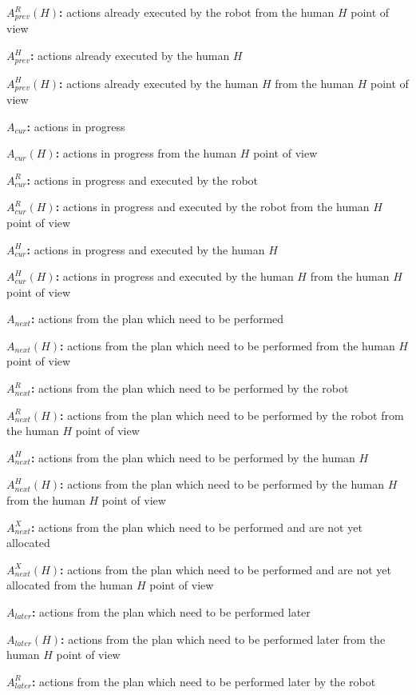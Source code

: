 \textbf{$A_{prev}^R(H)$:} actions already executed by the robot from the human $H$ point of view

\textbf{$A_{prev}^H$:} actions already executed by the human $H$

\textbf{$A_{prev}^H(H)$:} actions already executed by the human $H$ from the human $H$ point of view

\bigskip
\textbf{$A_{cur}$:} actions in progress

\textbf{$A_{cur}(H)$:} actions in progress from the human $H$ point of view

\textbf{$A_{cur}^R$:} actions in progress and executed by the robot

\textbf{$A_{cur}^R(H)$:} actions in progress and executed by the robot from the human $H$ point of view

\textbf{$A_{cur}^H$:} actions in progress and executed by the human $H$

\textbf{$A_{cur}^H(H)$:} actions in progress and executed by the human $H$ from the human $H$ point of view

\bigskip
\textbf{$A_{next}$:} actions from the plan which need to be performed

\textbf{$A_{next}(H)$:} actions from the plan which need to be performed from the human $H$ point of view

\textbf{$A_{next}^R$:} actions from the plan which need to be performed by the robot

\textbf{$A_{next}^R(H)$:} actions from the plan which need to be performed by the robot from the human $H$ point of view

\textbf{$A_{next}^H$:} actions from the plan which need to be performed by the human $H$

\textbf{$A_{next}^H(H)$:} actions from the plan which need to be performed by the human $H$ from the human $H$ point of view

\textbf{$A_{next}^X$:} actions from the plan which need to be performed and are not yet allocated

\textbf{$A_{next}^X(H)$:} actions from the plan which need to be performed and are not yet allocated from the human $H$ point of view

\bigskip
\textbf{$A_{later}$:} actions from the plan which need to be performed later

\textbf{$A_{later}(H)$:} actions from the plan which need to be performed later from the human $H$ point of view

\textbf{$A_{later}^R$:} actions from the plan which need to be performed later by the robot

